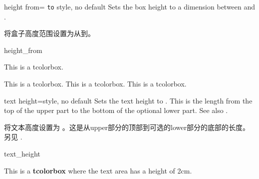 \begin{docTcbKey}{height from}{= \texttt{to} }{style, no default}
Sets the box height to a dimension between  and .

将盒子高度范围设置为从到。
\begin{exdispExample}{height_from}

\begin{mybox}
This is a tcolorbox.
\end{mybox}
\begin{mybox}
This is a tcolorbox. This is a tcolorbox. This is a tcolorbox.
\end{mybox}
\begin{mybox}
\lipsum[2]
\end{mybox}
\end{exdispExample}
\end{docTcbKey}



\begin{docTcbKey}[][doc new=2014-10-31]{text height}{=}{style, no default}
Sets the text height to . This is the length from the top 
of the upper part to the bottom of the optional lower part.
See also .

将文本高度设置为 。这是从upper部分的顶部到可选的lower部分的底部的长度。另见 .


\begin{exdispExample}{text_height}

\begin{tcolorbox}[text height=2cm]
This is a \textbf{tcolorbox} where the text area has a height of 2cm.
\end{tcolorbox}
\end{exdispExample}
\end{docTcbKey}





